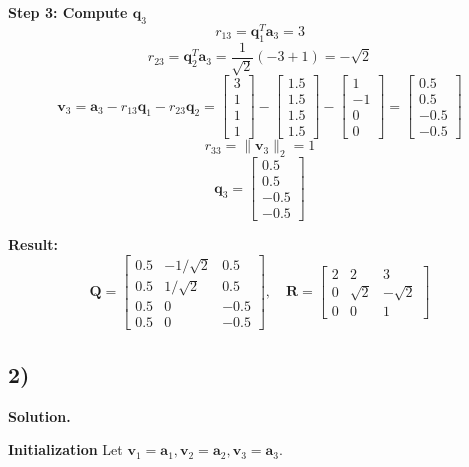 \documentclass{article}
\newcommand{\0}{{\mathbf{0}}} %
\begin{document}
\textbf{Step 3: Compute $\mathbf{q}_3$}
\[
r_{13} = \mathbf{q}_1^T \mathbf{a}_3 = 3
\]
\[
r_{23} = \mathbf{q}_2^T \mathbf{a}_3 = \frac{1}{\sqrt{2}}(-3 + 1) = -\sqrt{2}
\]
\[
\mathbf{v}_3 = \mathbf{a}_3 - r_{13}\mathbf{q}_1 - r_{23}\mathbf{q}_2
=
\begin{bmatrix} 3 \\ 1 \\ 1 \\ 1
\end{bmatrix} -
\begin{bmatrix} 1.5 \\ 1.5 \\ 1.5 \\ 1.5
\end{bmatrix} -
\begin{bmatrix} 1 \\ -1 \\ 0 \\ 0
\end{bmatrix}
=
\begin{bmatrix} 0.5 \\ 0.5 \\ -0.5 \\ -0.5
\end{bmatrix}
\]
\[
r_{33} = \|\mathbf{v}_3\|_2 = 1
\]
\[
\mathbf{q}_3 =
\begin{bmatrix} 0.5 \\ 0.5 \\ -0.5 \\ -0.5
\end{bmatrix}
\]

\textbf{Result:}
\[
\mathbf{Q} =
\begin{bmatrix} 0.5 & -1/\sqrt{2} & 0.5 \\ 0.5 & 1/\sqrt{2} & 0.5 \\ 0.5 & 0 & -0.5 \\ 0.5 & 0 & -0.5
\end{bmatrix}, \quad
\mathbf{R} =
\begin{bmatrix} 2 & 2 & 3 \\ 0 & \sqrt{2} & -\sqrt{2} \\ 0 & 0 & 1
\end{bmatrix}
\]

\newpage

\subsection*{2)}
\textbf{Solution.}

\textbf{Initialization}
Let $\mathbf{v}_1 = \mathbf{a}_1, \mathbf{v}_2 = \mathbf{a}_2, \mathbf{v}_3 = \mathbf{a}_3$.
\end{document}
